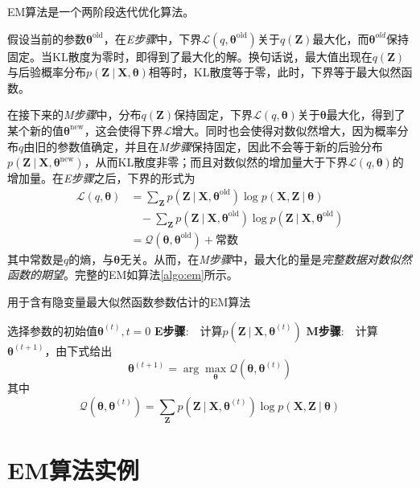 \documentclass[11pt]{ctexbook}
\begin{document}
EM算法是一个两阶段迭代优化算法。

假设当前的参数$\bm\theta^{\mathrm{old}}$，在\emph{E步骤}中，下界$\mathcal L(q, \bm\theta^{\mathrm{old}})$关于$q(\bm Z)$最大化，而$\bm\theta^{old}$保持固定。当KL散度为零时，即得到了最大化的解。换句话说，最大值出现在$q(\bm Z)$与后验概率分布$p(\bm Z\ |\ \bm X, \bm\theta)$相等时，KL散度等于零，此时，下界等于最大似然函数。

在接下来的\emph{M步骤}中，分布$q(\bm Z)$保持固定，下界$\mathcal L(q, \bm\theta)$关于$\bm\theta$最大化，得到了某个新的值$\bm\theta^{\mathrm{new}}$，这会使得下界$\mathcal L$增大。同时也会使得对数似然增大，因为概率分布$q$由旧的参数值确定，并且在\emph{M步骤}保持固定，因此不会等于新的后验分布$p(\bm Z\ |\ \bm X,\bm\theta^{\mathrm{new}})$，从而KL散度非零；而且对数似然的增加量大于下界$\mathcal L(q, \bm\theta)$的增加量。在\emph{E步骤}之后，下界的形式为
\begin{align*}
	\mathcal L(q, \bm\theta) &= \sum_{\bm Z}p(\bm Z\ |\ \bm X, \bm\theta^{\mathrm{old}})\log p(\bm X, \bm Z\ |\ \bm\theta)\\
	& \ \ \ \ - \sum_{\bm Z}p(\bm Z\ |\ \bm X,\bm\theta^{\mathrm{old}})\log p(\bm Z\ |\ \bm X, \bm\theta^{\mathrm{old}}) \\
	&= \mathcal Q(\bm\theta, \bm\theta^{\mathrm{old}}) + \text{常数}
\end{align*}
其中常数是$q$的熵，与$\bm \theta$无关。从而，在\emph{M步骤}中，最大化的量是\emph{完整数据对数似然函数的期望}。完整的EM如算法\ref{algo:em}所示。
\begin{algorithm}
\caption{用于含有隐变量最大似然函数参数估计的EM算法}
\label{algo:em}
\begin{algorithmic}[1]
\STATE 选择参数的初始值$\bm\theta^{(t)}, t = 0$
\REPEAT
\STATE \textbf{E步骤}:\ \ 计算$p(\bm Z\ |\ \bm X, \bm\theta^{(t)})$
\STATE \textbf{M步骤}:\ \ 计算$\bm\theta^{(t+1)}$，由下式给出
\begin{equation*}
	\bm \theta^{(t+1)} = \arg\max_{\bm \theta}\mathcal Q (\bm\theta, \bm\theta^{(t)})
\end{equation*}
其中
\begin{equation*}
	\mathcal Q (\bm\theta, \bm\theta^{(t)}) = \sum_{\bm Z}p(\bm Z\ |\ \bm X, \bm \theta^{(t)}) \log p(\bm X, \bm Z\ |\ \bm\theta)
\end{equation*}
\end{algorithmic}
\end{algorithm}

\section{EM算法实例}
\end{document}

